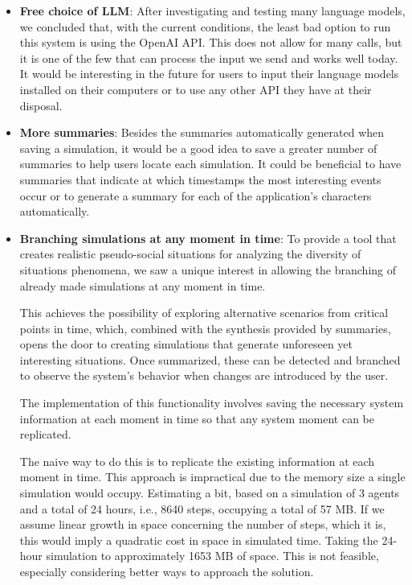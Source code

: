 \begin{itemize}
	\item \textbf{Free choice of LLM}: After investigating and testing many language models, we concluded that, with the current conditions, the least bad option to run this system is using the OpenAI API. This does not allow for many calls, but it is one of the few that can process the input we send and works well today. It would be interesting in the future for users to input their language models installed on their computers or to use any other API they have at their disposal.
	
	\item \textbf{More summaries}: Besides the summaries automatically generated when saving a simulation, it would be a good idea to save a greater number of summaries to help users locate each simulation. It could be beneficial to have summaries that indicate at which timestamps the most interesting events occur or to generate a summary for each of the application's characters automatically.
	
	\item \textbf{Branching simulations at any moment in time}: To provide a tool that creates realistic pseudo-social situations for analyzing the diversity of situations phenomena, we saw a unique interest in allowing the branching of already made simulations at any moment in time.
	
	This achieves the possibility of exploring alternative scenarios from critical points in time, which, combined with the synthesis provided by summaries, opens the door to creating simulations that generate unforeseen yet interesting situations. Once summarized, these can be detected and branched to observe the system's behavior when changes are introduced by the user.
	
	The implementation of this functionality involves saving the necessary system information at each moment in time so that any system moment can be replicated.
	
	The naive way to do this is to replicate the existing information at each moment in time. This approach is impractical due to the memory size a single simulation would occupy. Estimating a bit, based on a simulation of 3 agents and a total of 24 hours, i.e., 8640 steps, occupying a total of 57 MB. If we assume linear growth in space concerning the number of steps, which it is, this would imply a quadratic cost in space in simulated time. Taking the 24-hour simulation to approximately 1653 MB of space. This is not feasible, especially considering better ways to approach the solution.
\end{itemize}
